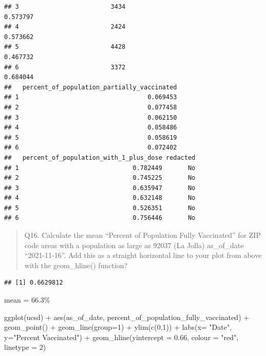 \documentclass[
]{article}
\newenvironment{Shaded}{\begin{snugshade}}{\end{snugshade}}
\newcommand{\AttributeTok}[1]{\textcolor[rgb]{0.77,0.63,0.00}{#1}}
\newcommand{\DecValTok}[1]{\textcolor[rgb]{0.00,0.00,0.81}{#1}}
\newcommand{\FloatTok}[1]{\textcolor[rgb]{0.00,0.00,0.81}{#1}}
\newcommand{\FunctionTok}[1]{\textcolor[rgb]{0.00,0.00,0.00}{#1}}
\newcommand{\NormalTok}[1]{#1}
\newcommand{\SpecialCharTok}[1]{\textcolor[rgb]{0.00,0.00,0.00}{#1}}
\newcommand{\StringTok}[1]{\textcolor[rgb]{0.31,0.60,0.02}{#1}}
\begin{document}
\begin{verbatim}
## 3                         3434                               0.573797
## 4                         2424                               0.573662
## 5                         4428                               0.467732
## 6                         3372                               0.684044
##   percent_of_population_partially_vaccinated
## 1                                   0.069453
## 2                                   0.077458
## 3                                   0.062150
## 4                                   0.058486
## 5                                   0.058619
## 6                                   0.072402
##   percent_of_population_with_1_plus_dose redacted
## 1                               0.782449       No
## 2                               0.745225       No
## 3                               0.635947       No
## 4                               0.632148       No
## 5                               0.526351       No
## 6                               0.756446       No
\end{verbatim}

\begin{quote}
Q16. Calculate the mean ``Percent of Population Fully Vaccinated'' for
ZIP code areas with a population as large as 92037 (La Jolla)
as\_of\_date ``2021-11-16''. Add this as a straight horizontal line to
your plot from above with the geom\_hline() function?
\end{quote}

\begin{Shaded}
\end{Shaded}

\begin{verbatim}
## [1] 0.6629812
\end{verbatim}

mean = 66.3\%

\begin{Shaded}
\begin{Highlighting}[]
\FunctionTok{ggplot}\NormalTok{(ucsd) }\SpecialCharTok{+}
  \FunctionTok{aes}\NormalTok{(as\_of\_date,}
\NormalTok{      percent\_of\_population\_fully\_vaccinated) }\SpecialCharTok{+}
  \FunctionTok{geom\_point}\NormalTok{() }\SpecialCharTok{+} 
  \FunctionTok{geom\_line}\NormalTok{(}\AttributeTok{group=}\DecValTok{1}\NormalTok{) }\SpecialCharTok{+}
  \FunctionTok{ylim}\NormalTok{(}\FunctionTok{c}\NormalTok{(}\DecValTok{0}\NormalTok{,}\DecValTok{1}\NormalTok{)) }\SpecialCharTok{+}
  \FunctionTok{labs}\NormalTok{(}\AttributeTok{x=} \StringTok{"Date"}\NormalTok{, }\AttributeTok{y=}\StringTok{"Percent Vaccinated"}\NormalTok{) }\SpecialCharTok{+}
  \FunctionTok{geom\_hline}\NormalTok{(}\AttributeTok{yintercept =} \FloatTok{0.66}\NormalTok{, }\AttributeTok{colour =} \StringTok{"red"}\NormalTok{, }\AttributeTok{linetype =} \DecValTok{2}\NormalTok{)}
\end{Highlighting}
\end{Shaded}
\end{document}
